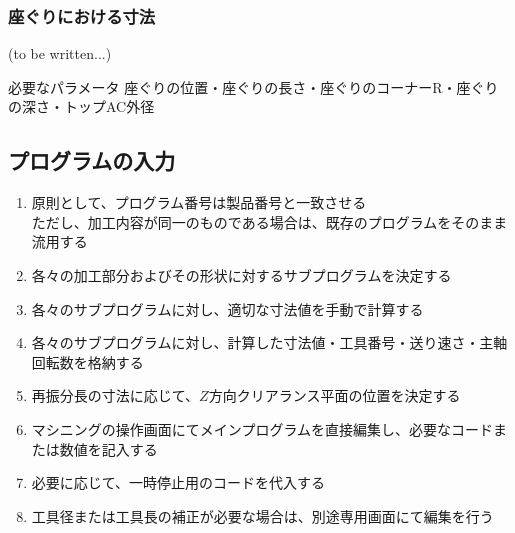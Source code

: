 \subsubsection{座ぐりにおける寸法\TBW}
(to be written...)
\begin{Parameter}{必要なパラメータ}
座ぐりの位置・座ぐりの長さ・座ぐりのコーナーR・座ぐりの深さ・トップAC外径
\end{Parameter}


\subsection{プログラムの入力}
\begin{enumerate}
\item 原則として、プログラム番号は製品番号と一致させる\\
ただし、加工内容が同一のものである場合は、既存のプログラムをそのまま流用する
\item 各々の加工部分およびその形状に対するサブプログラムを決定する
\item 各々のサブプログラムに対し、適切な寸法値を手動で計算する
\item 各々のサブプログラムに対し、計算した寸法値・工具番号・送り速さ・主軸回転数を格納する
\item {}再振分長の寸法に応じて、$Z$方向クリアランス平面の位置を決定する
\item マシニングの操作画面にてメインプログラムを直接編集し、必要なコードまたは数値を記入する
\item 必要に応じて、一時停止用のコードを代入する
\item {}工具径または工具長の補正が必要な場合は、別途専用画面にて編集を行う
\end{enumerate}


